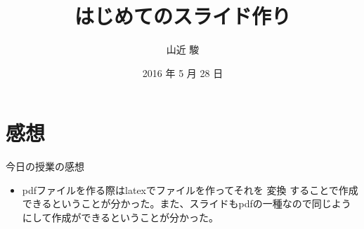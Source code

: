 \documentclass[compress,dvipdfmx,11pt]{beamer}
\title[2025年 大崎研究室ゼミ]{\bf はじめてのスライド作り}
\author[]{山近 駿}
\institute{関西学院大学 工学部 情報工学課程}
\date{2016 年 5 月 28 日}
\begin{document}
\maketitle

\newcommand{\pivec}{\mathbf \pi}
\newcommand{\xvec}{\mathbf x}
\newcommand{\yvec}{\mathbf y}
\newcommand{\zvec}{\mathbf z}
\newcommand{\Emat}{\mathbf E}
\newcommand{\Imat}{\mathbf I}

\bf
\section{感想}
\label{sec:org6dcaea9}
\begin{frame}[label={sec:org066d3fe}]{今日の授業の感想}
\begin{itemize}
\item pdfファイルを作る際はlatexでファイルを作ってそれを \alert{変換} することで作成
できるということが分かった。また、スライドもpdfの一種なので同じよう
にして作成ができるということが分かった。
\end{itemize}
\end{frame}
\end{document}
